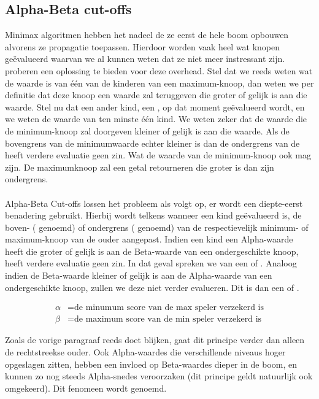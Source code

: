 \subsection{Alpha-Beta cut-offs}
Minimax algoritmen hebben het nadeel de ze eerst de hele boom opbouwen alvorens ze propagatie toepassen. Hierdoor worden vaak heel wat knopen geëvalueerd waarvan we al kunnen weten dat ze niet meer instressant zijn.  proberen een oplossing te bieden voor deze overhead. Stel dat we reeds weten wat de waarde is van één van de kinderen van een maximum-knoop, dan weten we per definitie dat deze knoop een waarde zal teruggeven die groter of gelijk is aan die waarde. Stel nu dat een ander kind, een , op dat moment geëvalueerd wordt, en we weten de waarde van ten minste één kind. We weten zeker dat de waarde die de minimum-knoop zal doorgeven kleiner of gelijk is aan die waarde. Als de bovengrens van de minimumwaarde echter kleiner is dan de ondergrens van de  heeft verdere evaluatie geen zin. Wat de waarde van de minimum-knoop ook mag zijn. De maximumknoop zal een getal retourneren die groter is dan zijn ondergrens.
\paragraph{}
Alpha-Beta Cut-offs lossen het probleem als volgt op, er wordt een diepte-eerst benadering gebruikt. Hierbij wordt telkens wanneer een kind geëvalueerd is, de boven- ( genoemd) of ondergrens ( genoemd) van de respectievelijk minimum- of maximum-knoop van de ouder aangepast. Indien een kind een Alpha-waarde heeft die groter of gelijk is aan de Beta-waarde van een ondergeschikte knoop, heeft verdere evaluatie geen zin. In dat geval spreken we van een  of . Analoog indien de Beta-waarde kleiner of gelijk is aan de Alpha-waarde van een ondergeschikte knoop, zullen we deze niet verder evalueren. Dit is dan een  of .

\begin{align*}
  \alpha &= \text{de minumum score van de max speler verzekerd is} \\
  \beta  &= \text{de maximum score van de min speler verzekerd is}
\end{align*}


Zoals de vorige paragraaf reeds doet blijken, gaat dit principe verder dan alleen de rechtstreekse ouder. Ook Alpha-waardes die verschillende niveaus hoger opgeslagen zitten, hebben een invloed op Beta-waardes dieper in de boom, en kunnen zo nog steeds Alpha-snedes veroorzaken (dit principe geldt natuurlijk ook omgekeerd). Dit fenomeen wordt  genoemd.
